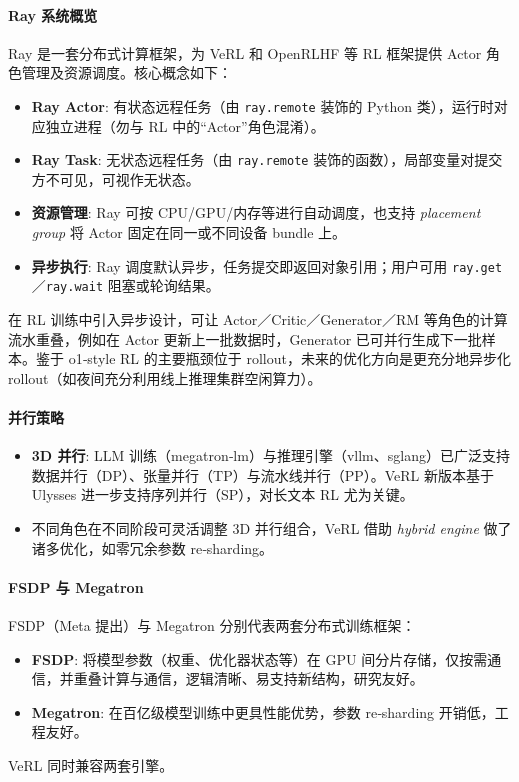 \documentclass{pkuthesis}
\begin{document}
\paragraph{Ray 系统概览}
Ray 是一套分布式计算框架，为 VeRL 和 OpenRLHF 等 RL 框架提供 Actor 角色管理及资源调度。核心概念如下：
\begin{itemize}
    \item \textbf{Ray Actor}: 有状态远程任务（由 \texttt{ray.remote} 装饰的 Python 类），运行时对应独立进程（勿与 RL 中的“Actor”角色混淆）。
    \item \textbf{Ray Task}: 无状态远程任务（由 \texttt{ray.remote} 装饰的函数），局部变量对提交方不可见，可视作无状态。
    \item \textbf{资源管理}: Ray 可按 CPU/GPU/内存等进行自动调度，也支持 \textit{placement group} 将 Actor 固定在同一或不同设备 bundle 上。
    \item \textbf{异步执行}: Ray 调度默认异步，任务提交即返回对象引用；用户可用 \texttt{ray.get}／\texttt{ray.wait} 阻塞或轮询结果。
\end{itemize}
在 RL 训练中引入异步设计，可让 Actor／Critic／Generator／RM 等角色的计算流水重叠，例如在 Actor 更新上一批数据时，Generator 已可并行生成下一批样本。鉴于 o1‐style RL 的主要瓶颈位于 rollout，未来的优化方向是更充分地异步化 rollout（如夜间充分利用线上推理集群空闲算力）。

\paragraph{并行策略}
\begin{itemize}
    \item \textbf{3D 并行}: LLM 训练（megatron‐lm）与推理引擎（vllm、sglang）已广泛支持数据并行（DP）、张量并行（TP）与流水线并行（PP）。VeRL 新版本基于 Ulysses 进一步支持序列并行（SP），对长文本 RL 尤为关键。
    \item 不同角色在不同阶段可灵活调整 3D 并行组合，VeRL 借助 \emph{hybrid engine} 做了诸多优化，如零冗余参数 re‐sharding。
\end{itemize}

\paragraph{FSDP 与 Megatron}
FSDP（Meta 提出）与 Megatron 分别代表两套分布式训练框架：
\begin{itemize}
    \item \textbf{FSDP}: 将模型参数（权重、优化器状态等）在 GPU 间分片存储，仅按需通信，并重叠计算与通信，逻辑清晰、易支持新结构，研究友好。
    \item \textbf{Megatron}: 在百亿级模型训练中更具性能优势，参数 re‐sharding 开销低，工程友好。
\end{itemize}
VeRL 同时兼容两套引擎。
\end{document}
